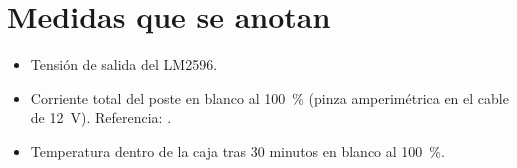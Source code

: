 \section{Medidas que se anotan}
\begin{itemize}
\item Tensión de salida del LM2596.
\item Corriente total del poste en blanco al 100~\% (pinza amperimétrica en el cable de 12~V). Referencia: .
\item Temperatura dentro de la caja tras 30 minutos en blanco al 100~\%.
\end{itemize}

